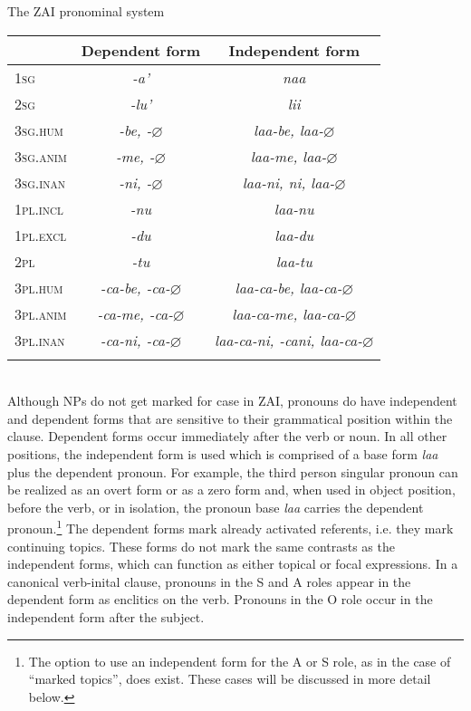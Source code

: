  
\ea\label{izpronounstable}  The ZAI pronominal system

\begin{tabular}{| l  c  c }
\lsptoprule
 & Dependent form & Independent form \\

\midrule
1\textsc{sg} & \emph{-a'} & \emph{naa} \\

\midrule
2\textsc{sg} & \emph{-lu'} & \emph{lii} \\

\midrule
3\textsc{sg.hum} & \emph{-be, -$\varnothing$} & \emph{laa-be, laa-$\varnothing$} \\

\midrule
3\textsc{sg.anim} & \emph{-me, -$\varnothing$} & \emph{laa-me, laa-$\varnothing$} \\

\midrule
3\textsc{sg.inan} &  \emph{-ni, -$\varnothing$} & \emph{laa-ni, ni, laa-$\varnothing$} \\

\midrule
1\textsc{pl.incl} & \emph{-nu} & \emph {laa-nu} \\

\midrule
1\textsc{pl.excl} & \emph{-du} & \emph {laa-du} \\

\midrule
2\textsc{pl} & \emph{-tu} & \emph {laa-tu} \\

\midrule
3\textsc{pl.hum} &  \emph{-ca-be, -ca-$\varnothing$} & \emph {laa-ca-be, laa-ca-$\varnothing$} \\

\midrule
3\textsc{pl.anim} &\emph{-ca-me, -ca-$\varnothing$} & \emph{laa-ca-me, laa-ca-$\varnothing$} \\

\midrule
3\textsc{pl.inan} &  \emph{-ca-ni, -ca-$\varnothing$} & \emph{laa-ca-ni, -cani, laa-ca-$\varnothing$} \\

\lspbottomrule
\end{tabular}\\
\z
Although NPs do not get marked for case in ZAI, pronouns do have independent and dependent forms that are sensitive to their grammatical position within the clause. Dependent forms occur immediately after the verb or noun. In all other positions, the independent form is used which is comprised of a base form \textit{laa} plus the dependent pronoun. For example, the third person singular pronoun can be realized as an overt form or as a zero form and, when used in object position, before the verb, or in isolation, the pronoun base \textit{laa} carries the dependent pronoun.\footnote{The option to use an independent form for the A or S role, as in the case of ``marked topics'', does exist. These cases will be discussed in more detail below.} The dependent forms mark already activated referents, i.e. they mark continuing topics. These forms do not mark the same contrasts as the independent forms, which can function as either topical or focal expressions. In a canonical verb-inital clause, pronouns in the S and A roles appear in the dependent form as enclitics on the verb. Pronouns in the O role occur in the independent form after the subject.

